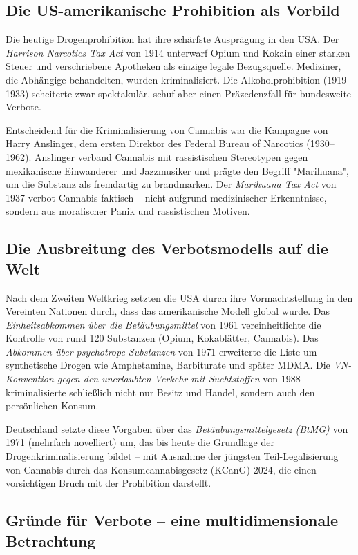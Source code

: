 \documentclass[11pt,a4paper]{article}
\begin{document}
	\subsection{Die US-amerikanische Prohibition als Vorbild}
	
	Die heutige Drogenprohibition hat ihre schärfste Ausprägung in den USA. Der \textit{Harrison Narcotics Tax Act} von 1914 unterwarf Opium und Kokain einer starken Steuer und verschriebene Apotheken als einzige legale Bezugsquelle. Mediziner, die Abhängige behandelten, wurden kriminalisiert. Die Alkoholprohibition (1919–1933) scheiterte zwar spektakulär, schuf aber einen Präzedenzfall für bundesweite Verbote. 
	
	Entscheidend für die Kriminalisierung von Cannabis war die Kampagne von Harry Anslinger, dem ersten Direktor des Federal Bureau of Narcotics (1930–1962). Anslinger verband Cannabis mit rassistischen Stereotypen gegen mexikanische Einwanderer und Jazzmusiker und prägte den Begriff "Marihuana", um die Substanz als fremdartig zu brandmarken. Der \textit{Marihuana Tax Act} von 1937 verbot Cannabis faktisch – nicht aufgrund medizinischer Erkenntnisse, sondern aus moralischer Panik und rassistischen Motiven.
	
	\subsection{Die Ausbreitung des Verbotsmodells auf die Welt}
	
	Nach dem Zweiten Weltkrieg setzten die USA durch ihre Vormachtstellung in den Vereinten Nationen durch, dass das amerikanische Modell global wurde. Das \textit{Einheitsabkommen über die Betäubungsmittel} von 1961 vereinheitlichte die Kontrolle von rund 120 Substanzen (Opium, Kokablätter, Cannabis). Das \textit{Abkommen über psychotrope Substanzen} von 1971 erweiterte die Liste um synthetische Drogen wie Amphetamine, Barbiturate und später MDMA. Die \textit{VN-Konvention gegen den unerlaubten Verkehr mit Suchtstoffen} von 1988 kriminalisierte schließlich nicht nur Besitz und Handel, sondern auch den persönlichen Konsum.
	
	Deutschland setzte diese Vorgaben über das \textit{Betäubungsmittelgesetz (BtMG)} von 1971 (mehrfach novelliert) um, das bis heute die Grundlage der Drogenkriminalisierung bildet – mit Ausnahme der jüngsten Teil-Legalisierung von Cannabis durch das Konsumcannabisgesetz (KCanG) 2024, die einen vorsichtigen Bruch mit der Prohibition darstellt.
	
	\subsection{Gründe für Verbote – eine multidimensionale Betrachtung}
	
\end{document}
